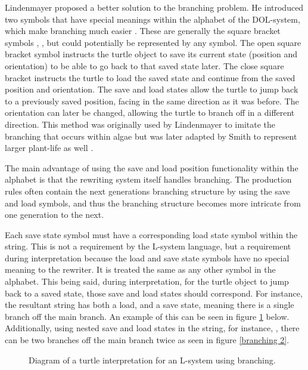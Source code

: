 Lindenmayer proposed a better solution to the branching problem. He introduced two symbols that have special meanings within the alphabet of the DOL-system, which make branching much easier \cite{lindenmayer1968mathematical}. These are generally the square bracket symbols \say{[}, \say{]}, but could potentially be represented by any symbol. The open square bracket \say{[} symbol instructs the turtle object to save its current state (position and orientation) to be able to go back to that saved state later. The close square bracket \say{]} instructs the turtle to load the saved state and continue from the saved position and orientation. The save and load states allow the turtle to jump back to a previously saved position, facing in the same direction as it was before. The orientation can later be changed, allowing the turtle to branch off in a different direction. This method was originally used by Lindenmayer to imitate the branching that occurs within algae but was later adapted by Smith to represent larger plant-life as well \cite{smith1984plants}.
 
The main advantage of using the save and load position functionality within the alphabet is that the rewriting system itself handles branching. The production rules often contain the next generations branching structure by using the save and load symbols, and thus the branching structure becomes more intricate from one generation to the next.

Each save state symbol must have a corresponding load state symbol within the string. This is not a requirement by the L-system language, but a requirement during interpretation because the load and save state symbols have no special meaning to the rewriter. It is treated the same as any other symbol in the alphabet. This being said, during interpretation, for the turtle object to jump back to a saved state, those save and load states should correspond. For instance, the resultant string  has both a load, and a save state, meaning there is a single branch off the main branch. An example of this can be seen in figure \ref{branching 1} below. Additionally, using nested save and load states in the string, for instance, , there can be two branches off the main branch twice as seen in figure \ref{branching 2}.

\begin{figure}[htbp]
	{\centering
		\setlength{\fboxrule}{1pt}
		\vspace{7px}
		\caption{Diagram of a turtle interpretation for an L-system using branching.} \label{branching 1}
	}
\end{figure}
\FloatBarrier

